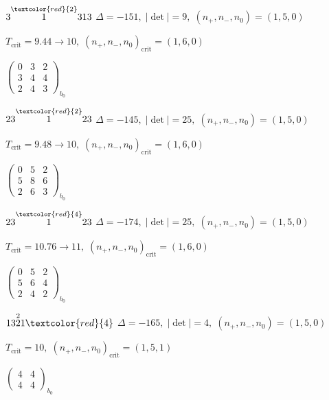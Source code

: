 \documentclass[10pt]{article}
\begin{document}
\smallskip

$3\overset{\textcolor{red}{2}}{1}313$ \quad $\Delta=-151,\; |\det|=9,\; (n_+,n_-,n_0)=(1,5,0)$

\hspace{1em}$T_{\text{crit}}=9.44 \to 10,\; (n_+,n_-,n_0)_{\text{crit}}=(1,6,0)$

\hspace{2em}$\left(\begin{smallmatrix}0 & 3 & 2 \\ 3 & 4 & 4 \\ 2 & 4 & 3\end{smallmatrix}\right)_{\!b_0}$

\smallskip

$23\overset{\textcolor{red}{2}}{1}23$ \quad $\Delta=-145,\; |\det|=25,\; (n_+,n_-,n_0)=(1,5,0)$

\hspace{1em}$T_{\text{crit}}=9.48 \to 10,\; (n_+,n_-,n_0)_{\text{crit}}=(1,6,0)$

\hspace{2em}$\left(\begin{smallmatrix}0 & 5 & 2 \\ 5 & 8 & 6 \\ 2 & 6 & 3\end{smallmatrix}\right)_{\!b_0}$

$23\overset{\textcolor{red}{4}}{1}23$ \quad $\Delta=-174,\; |\det|=25,\; (n_+,n_-,n_0)=(1,5,0)$

\hspace{1em}$T_{\text{crit}}=10.76 \to 11,\; (n_+,n_-,n_0)_{\text{crit}}=(1,6,0)$

\hspace{2em}$\left(\begin{smallmatrix}0 & 5 & 2 \\ 5 & 6 & 4 \\ 2 & 4 & 2\end{smallmatrix}\right)_{\!b_0}$

\smallskip

$13\overset{2}{2}1\textcolor{red}{4}$ \quad $\Delta=-165,\; |\det|=4,\; (n_+,n_-,n_0)=(1,5,0)$

\hspace{1em}$T_{\text{crit}}=10,\; (n_+,n_-,n_0)_{\text{crit}}=(1,5,1)$

\hspace{2em}$\left(\begin{smallmatrix}4 & 4 \\ 4 & 4\end{smallmatrix}\right)_{\!b_0}$
\end{document}
